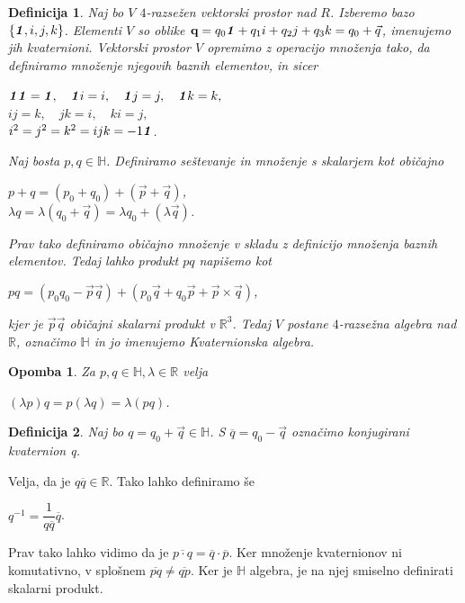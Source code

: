 \documentclass[a4paper,12pt]{article}
\def\R{\mathbb{R}} %
\def\H{\mathbb{H}} %
\def\1{\textbf{\emph{1}}}
\newtheorem{opomba}{Opomba}
\newtheorem{definicija}{Definicija}
\begin{document}
\begin{definicija}
Naj bo $V$ $4$-razsežen vektorski prostor nad $R$. Izberemo bazo $\left\{\1, i, j, k\right\}$. Elementi $V$ so oblike $\textbf{q} = q_{0}\1 + q_{1}i + q_{2}j + q_{3}k = q_{0} + \vec{q}$, imenujemo jih \emph{kvaternioni}.
Vektorski prostor $V$ opremimo z operacijo množenja tako, da definiramo množenje njegovih baznih elementov, in sicer
\begin{center}
   $\1 \1 = \1, \hspace{1em}  \1i = i, \hspace{1em} \1j = j, \hspace{1em} \1k = k,$\\
   $ij = k, \hspace{1em} jk = i, \hspace{1em} ki = j,$\\
   $i^2 = j^2 = k^2 = ijk = -1\1$.
\end{center}

Naj bosta $p, q \in \H$. Definiramo seštevanje in množenje s skalarjem kot običajno
\begin{center}
   $p + q = \left( p_{0} + q_{0} \right) + \left( \vec{p} + \vec{q} \right)$, \\
   $ \lambda q = \lambda \left(q_{0} + \vec{q} \right) = \lambda q_{0} + \left(\lambda \vec{q}\right) $.
\end{center}
Prav tako definiramo običajno množenje v skladu z definicijo množenja baznih elementov. Tedaj lahko
produkt $pq$ napišemo kot
\begin{center}
   $pq = (p_{0} q_{0} - \vec{p} \vec{q}) + (p_{0}\vec{q} + q_{0}\vec{p} + \vec{p}\times\vec{q})$,
\end{center}
kjer je $\vec{p}\vec{q}$ običajni skalarni produkt v $\R^3$.
Tedaj $V$ postane $4$-razsežna algebra nad $\R$, označimo $\H$ in jo imenujemo \emph{Kvaternionska algebra}.\emph{~\cite{dam1998quaternions}}
\end{definicija}
\begin{opomba}
Za $p,q \in \H, \lambda \in \R$ velja
\begin{center}
      $(\lambda p)q = p(\lambda q) = \lambda (pq)$.
\end{center}
\end{opomba}
\begin{definicija}
Naj bo $q = q_{0} + \vec{q}\in \H$. S $\overline{q} = q_{0} -\vec{q}$ označimo \emph{konjugirani kvaternion} q.
\end{definicija}
Velja, da je $q\overline{q} \in \R$. Tako lahko definiramo še 
\begin{center}
   $q^{-1} = \dfrac{1}{q\overline{q}} \overline{q}$.
\end{center}
Prav tako lahko vidimo da je $\overline{p \cdot q} = \overline{q} \cdot \overline{p}$. Ker množenje kvaternionov ni komutativno,
v splošnem $\overline{pq} \neq \overline{qp}$. Ker je $\H$ algebra, je na njej smiselno definirati skalarni produkt.
\end{document}
